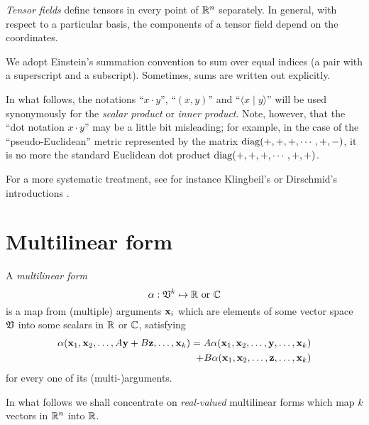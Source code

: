 {\em Tensor fields} define tensors in every point of ${\Bbb R}^n$ separately.
In general, with respect to a particular basis, the components of a tensor field
depend on the coordinates.


We adopt Einstein's summation convention to sum over equal indices
(a pair with a superscript and a subscript).
Sometimes, sums are written out explicitly.


In what follows, the notations
``$x\cdot y$'',
``$(x,y)$'' and
``$\langle x\mid y\rangle $'' will be used synonymously for the {\em
scalar product}
or
{\em inner product}.
Note, however, that the ``dot notation $x\cdot y$''
may be a little bit misleading; for example, in the case of the ``pseudo-Euclidean'' metric
represented by the matrix
 ${\rm diag}(+,+,+,\cdots ,+,-)$, it is no more the standard Euclidean dot product
${\rm diag}(+,+,+,\cdots ,+,+)$.

For a more systematic treatment, see for instance Klingbeil's
or Dirschmid's introductions
\cite{Klingbeil,Dirschmid}.


\section{Multilinear form}

A {\em multilinear form}
\begin{equation}
\alpha :{ \frak V }^k \mapsto {\Bbb R} \text{ or } {\Bbb C}
\end{equation}
is a map from (multiple) arguments ${\bf x}_i$ which are elements of some vector space  $\frak V$
into some scalars in ${\Bbb R}$ or ${\Bbb C}$,  satisfying
\begin{equation}
\begin{split}
\alpha ( {\bf x}_1,{\bf x}_2,\ldots , A {\bf y}+ B {\bf z}, \ldots ,{\bf x}_k)
=
A\alpha ( {\bf x}_1,{\bf x}_2,\ldots , {\bf y}, \ldots ,{\bf x}_k)   \\
   \qquad +
B\alpha ( {\bf x}_1,{\bf x}_2,\ldots , {\bf z}, \ldots ,{\bf x}_k)
\end{split}
\end{equation}
for every one of its (multi-)arguments.

In what follows we shall concentrate on {\em real-valued} multilinear forms which map
$k$ vectors in
${\Bbb R}^n$
into
${\Bbb R}$.


